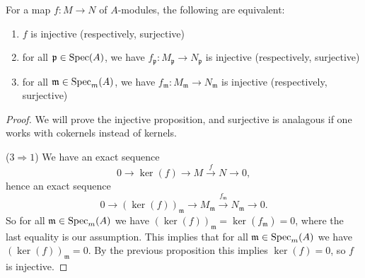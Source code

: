 \documentclass[12pt]{article}
\begin{document}
\begin{proposition}
\label{prop_inj_surj_is_local_property}
	For a map $f:M\to N$ of $A$-modules, the following are equivalent:
	\begin{enumerate}
		\item $f$ is injective (respectively, surjective)
		\item for all $\mathfrak{p}\in\text{Spec}(A)$, we have $f_\mathfrak{p}:M_\mathfrak{p}\to N_\mathfrak{p}$ is injective (respectively, surjective)
		\item for all $\mathfrak{m}\in\text{Spec}_m(A)$, we have $f_\mathfrak{m}:M_\mathfrak{m}\to N_\mathfrak{m}$ is injective (respectively, surjective)
	\end{enumerate}
\end{proposition}
\begin{proof}
	We will prove the injective proposition, and surjective is analagous if one works with cokernels instead of kernels.

	($3\Rightarrow 1$) We have an exact sequence 
	\begin{equation*}
		0 \to \ker(f) \to M \overset{f}{\to} N \to 0,
	\end{equation*}
	hence an exact sequence 
	\begin{equation*}
		0 \to (\ker(f))_\mathfrak{m} \to M_\mathfrak{m} \overset{f_\mathfrak{m}}{\to} N_\mathfrak{m} \to 0.
	\end{equation*}
	So for all $\mathfrak{m}\in\text{Spec}_m(A)$ we have $(\ker(f))_\mathfrak{m}=\ker(f_\mathfrak{m})=0$, where the last equality is our assumption. This implies that for all $\mathfrak{m}\in\text{Spec}_m(A)$ we have $(\ker(f))_\mathfrak{m}=0$. By the previous proposition this implies $\ker(f)=0$, so $f$ is injective.
\end{proof}
\end{document}
